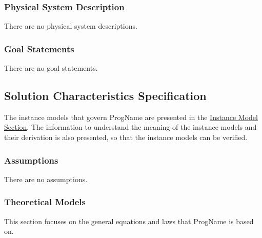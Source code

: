 \documentclass[12pt]{article}
\begin{document}
\subsubsection{Physical System Description}
\label{Sec:PhysSyst}
There are no physical system descriptions.

\subsubsection{Goal Statements}
\label{Sec:GoalStmt}
There are no goal statements.

\subsection{Solution Characteristics Specification}
\label{Sec:SolCharSpec}
The instance models that govern ProgName are presented in the \hyperref[Sec:IMs]{Instance Model Section}. The information to understand the meaning of the instance models and their derivation is also presented, so that the instance models can be verified.

\subsubsection{Assumptions}
\label{Sec:Assumps}
There are no assumptions.

\subsubsection{Theoretical Models}
\label{Sec:TMs}
This section focuses on the general equations and laws that ProgName is based on.
\end{document}
